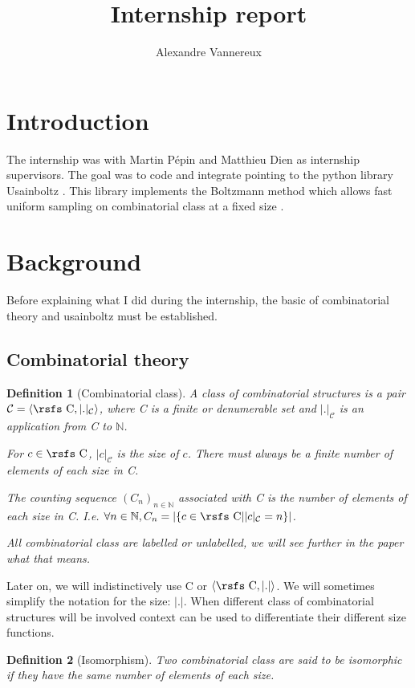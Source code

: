 \documentclass{article}
\date{}
\title{Internship report}
\author{Alexandre Vannereux}
\newtheorem{definition}{Definition}
\begin{document}
\maketitle
\section{Introduction}
The internship was with Martin Pépin and Matthieu Dien as internship supervisors. The goal was to code and integrate pointing to the python library Usainboltz \cite{USAINBOLTZ}. This library implements the Boltzmann method which allows fast uniform sampling on combinatorial class at a fixed size \cite{BS}.


\section{Background}
Before explaining what I did during the internship, the basic of combinatorial theory and usainboltz must be established.

\subsection{Combinatorial theory}
\begin{definition}[Combinatorial class]
A class of combinatorial structures is a pair $\mathcal{C} = \langle \text{\rsfs C}, |.|_{\mathcal{C}}\rangle$, where {\rsfs C} is a finite or denumerable set and $|.|_{\mathcal{C}}$ is an application from {\rsfs C} to $\mathbb{N}$.

For $c\in \text{\rsfs C}$, $|c|_{\mathcal{C}}$ is the size of $c$. There must always be a finite number of elements of each size in {\rsfs C}.

The counting sequence $(C_n)_{n\in \mathbb{N}}$ associated with {\rsfs C} is the number of elements of each size in {\rsfs C}. I.e. $\forall n\in \mathbb{N}, C_n = |\{c \in \text{\rsfs C} | |c|_{\mathcal{C}} = n\}|$.

All combinatorial class are labelled or unlabelled, we will see further in the paper what that means.
\end{definition}

Later on, we will indistinctively use {\rsfs C} or $\langle \text{\rsfs C}, |.|\rangle$. We will sometimes simplify the notation for the size: $|.|$. When different class of combinatorial structures will be involved context can be used to differentiate their different size functions.

\begin{definition}[Isomorphism]
Two combinatorial class are said to be isomorphic if they have the same number of elements of each size.
\end{definition}
\end{document}
